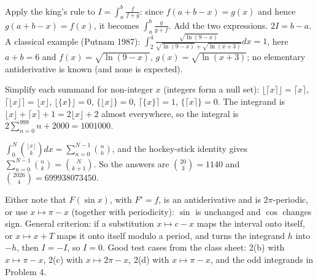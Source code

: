 \documentclass[11pt,a4paper]{article}
\begin{document}
Apply the king's rule to \(I=\int_a^b\frac{f}{f+g}\): since \(f(a+b-x)=g(x)\) and hence \(g(a+b-x)=f(x)\), it becomes \(\int_a^b\frac{g}{g+f}\). Add the two expressions.
\(2I=b-a\). A classical example (Putnam 1987): \(\int_2^4\frac{\sqrt{\ln(9-x)}}{\sqrt{\ln(9-x)}+\sqrt{\ln(x+3)}}dx=1\), here \(a+b=6\) and \(f(x)=\sqrt{\ln(9-x)}\), \(g(x)=\sqrt{\ln(x+3)}\); no elementary antiderivative is known (and none is expected).

Simplify each summand for non-integer \(x\) (integers form a null set): \(\lfloor\lceil x\rceil\rfloor=\lceil x\rceil\), \(\lceil\lfloor x\rfloor\rceil=\lfloor x\rfloor\), \(\lfloor\{x\}\rfloor=0\), \(\{\lfloor x\rfloor\}=0\), \(\lceil\{x\}\rceil=1\), \(\{\lceil x\rceil\}=0\).
The integrand is \(\lfloor x\rfloor+\lceil x\rceil+1=2\lfloor x\rfloor+2\) almost everywhere, so the integral is \(2\sum_{n=0}^{999}n+2000=1001000\).

\(\int_0^N\binom{\lfloor x\rfloor}{k}dx=\sum_{n=0}^{N-1}\binom nk\), and the hockey-stick identity gives \(\sum_{n=0}^{N-1}\binom nk=\binom N{k+1}\).
So the answers are \(\binom{20}3=1140\) and \(\binom{2026}4=699938073450\).

Either note that \(F(\sin x)\), with \(F'=f\), is an antiderivative and is \(2\pi\)-periodic, or use \(x\mapsto\pi-x\) (together with periodicity): \(\sin\) is unchanged and \(\cos\) changes sign.
General criterion: if a substitution \(x\mapsto c-x\) maps the interval onto itself, or \(x\mapsto x+T\) maps it onto itself modulo a period, and turns the integrand \(h\) into \(-h\), then \(I=-I\), so \(I=0\). Good test cases from the class sheet: 2(b) with \(x\mapsto\pi-x\), 2(c) with \(x\mapsto2\pi-x\), 2(d) with \(x\mapsto\pi-x\), and the odd integrands in Problem 4.
\end{document}
